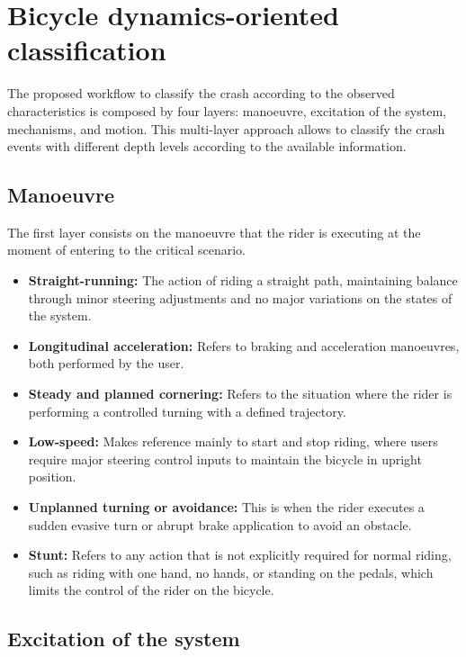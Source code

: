 \documentclass{article}
\begin{document}
\section{Bicycle dynamics-oriented classification}

The proposed workflow to classify the crash according to the observed characteristics is composed by four layers: manoeuvre, excitation of the system, mechanisms, and motion.
%
This multi-layer approach allows to classify the crash events with different depth levels according to the available information.
%


\subsection{Manoeuvre}

The first layer consists on the manoeuvre that the rider is executing at the moment of entering to the critical scenario.

\begin{itemize}
    \item \textbf{Straight-running:} The action of riding a straight path, maintaining balance through minor steering adjustments and no major variations on the states of the system.
    \item \textbf{Longitudinal acceleration:} Refers to braking and acceleration manoeuvres, both performed by the user.
    \item \textbf{Steady and planned cornering:} Refers to the situation where the rider is performing a controlled turning with a defined trajectory.
    \item \textbf{Low-speed:} Makes reference mainly to start and stop riding, where users require major steering control inputs to maintain the bicycle in upright position.
    \item \textbf{Unplanned turning or avoidance:} This is when the rider executes a sudden evasive turn or abrupt brake application to avoid an obstacle.
    \item \textbf{Stunt:} Refers to any action that is not explicitly required for normal riding, such as riding with one hand, no hands, or standing on the pedals, which limits the control of the rider on the bicycle.
\end{itemize}


\subsection{Excitation of the system}
\end{document}
